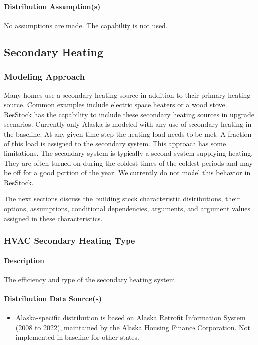 \paragraph{Distribution Assumption(s)}
No assumptions are made. The capability is not used.


\subsection{Secondary Heating}
\subsubsection{Modeling Approach}
Many homes use a secondary heating source in addition to their primary heating source. Common examples include electric space heaters or a wood stove. ResStock has the capability to include these secondary heating sources in upgrade scenarios. Currently only Alaska is modeled with any use of secondary heating in the baseline. At any given time step the heating load needs to be met. A fraction of this load is assigned to the secondary system. This approach has some limitations. The secondary system is typically a second system supplying heating. They are often turned on during the coldest times of the coldest periods and may be off for a good portion of the year. We currently do not model this behavior in ResStock.

The next sections discuss the building stock characteristic distributions, their options, assumptions, conditional dependencies, arguments, and argument values assigned in these characteristics.

\subsubsection{HVAC Secondary Heating Type}
\paragraph{Description}
The efficiency and type of the secondary heating system.
\paragraph{Distribution Data Source(s)}
\begin{itemize}
\item Alaska-specific distribution is based on Alaska Retrofit Information System (2008 to 2022), maintained by the Alaska Housing Finance Corporation. Not implemented in baseline for other states.
\end{itemize}
